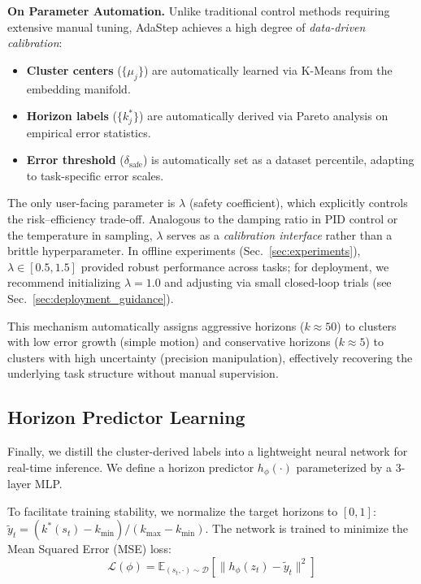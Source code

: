 \documentclass[conference]{IEEEtran}
\begin{document}
\textbf{On Parameter Automation.} 
Unlike traditional control methods requiring extensive manual tuning, AdaStep achieves a high degree of \emph{data-driven calibration}:
\begin{itemize}
    \item \textbf{Cluster centers} ($\{\mu_j\}$) are automatically learned via K-Means from the embedding manifold.
    \item \textbf{Horizon labels} ($\{k_j^*\}$) are automatically derived via Pareto analysis on empirical error statistics.
    \item \textbf{Error threshold} ($\delta_{\text{safe}}$) is automatically set as a dataset percentile, adapting to task-specific error scales.
\end{itemize}
The only user-facing parameter is $\lambda$ (safety coefficient), which explicitly controls the risk--efficiency trade-off. Analogous to the damping ratio in PID control or the temperature in sampling, $\lambda$ serves as a \emph{calibration interface} rather than a brittle hyperparameter. In offline experiments (Sec.~\ref{sec:experiments}), $\lambda \in [0.5, 1.5]$ provided robust performance across tasks; for deployment, we recommend initializing $\lambda=1.0$ and adjusting via small closed-loop trials (see Sec.~\ref{sec:deployment_guidance}).

This mechanism automatically assigns aggressive horizons ($k \approx 50$) to clusters with low error growth (simple motion) and conservative horizons ($k \approx 5$) to clusters with high uncertainty (precision manipulation), effectively recovering the underlying task structure without manual supervision.

\subsection{Horizon Predictor Learning}
Finally, we distill the cluster-derived labels into a lightweight neural network for real-time inference. We define a horizon predictor $h_\phi(\cdot)$ parameterized by a 3-layer MLP.

To facilitate training stability, we normalize the target horizons to $[0, 1]$: $\tilde{y}_t = (k^*(s_t) - k_{\min}) / (k_{\max} - k_{\min})$. The network is trained to minimize the Mean Squared Error (MSE) loss:
\begin{equation}
\mathcal{L}(\phi) = \mathbb{E}_{(s_t, \cdot) \sim \mathcal{D}} \left[ \| h_\phi(z_t) - \tilde{y}_t \|^2 \right]
\end{equation}
\end{document}
